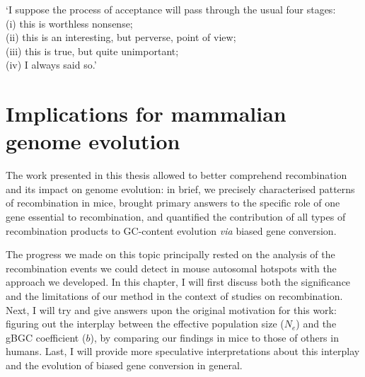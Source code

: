 \begin{savequote}[8cm]

	‘I suppose the process of acceptance will pass through the usual four stages:\\
	(i) this is worthless nonsense;\\
	(ii) this is an interesting, but perverse, point of view;\\
	(iii) this is true, but quite unimportant;\\
	(iv) I always said so.’
	
	
\end{savequote}

\chapter{\label{ch:9-discussion}Implications for mammalian genome evolution}


\minitoc{}


The work presented in this thesis allowed to better comprehend recombination and its impact on genome evolution: 
in brief, we precisely characterised patterns of recombination in mice, brought primary answers to the specific role of one gene essential to recombination, and quantified the contribution of all types of recombination products to GC-content evolution \textit{via} biased gene conversion.

The progress we made on this topic principally rested on the analysis of the recombination events we could detect in mouse autosomal hotspots with the approach we developed. 
In this chapter, I will first discuss both the significance and the limitations of our method in the context of studies on recombination.
Next, I will try and give answers upon the original motivation for this work: figuring out the interplay between the effective population size ($N_e$) and the gBGC coefficient ($b$), by comparing our findings in mice to those of others in humans.
Last, I will provide more speculative interpretations about this interplay and the evolution of biased gene conversion in general.

